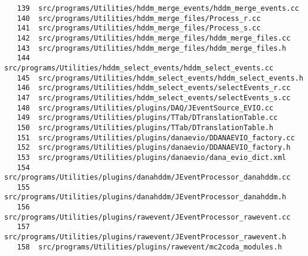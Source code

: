 \small
\begin{verbatim}
   139  src/programs/Utilities/hddm_merge_events/hddm_merge_events.cc
   140  src/programs/Utilities/hddm_merge_files/Process_r.cc
   141  src/programs/Utilities/hddm_merge_files/Process_s.cc
   142  src/programs/Utilities/hddm_merge_files/hddm_merge_files.cc
   143  src/programs/Utilities/hddm_merge_files/hddm_merge_files.h
   144  src/programs/Utilities/hddm_select_events/hddm_select_events.cc
   145  src/programs/Utilities/hddm_select_events/hddm_select_events.h
   146  src/programs/Utilities/hddm_select_events/selectEvents_r.cc
   147  src/programs/Utilities/hddm_select_events/selectEvents_s.cc
   148  src/programs/Utilities/plugins/DAQ/JEventSource_EVIO.cc
   149  src/programs/Utilities/plugins/TTab/DTranslationTable.cc
   150  src/programs/Utilities/plugins/TTab/DTranslationTable.h
   151  src/programs/Utilities/plugins/danaevio/DDANAEVIO_factory.cc
   152  src/programs/Utilities/plugins/danaevio/DDANAEVIO_factory.h
   153  src/programs/Utilities/plugins/danaevio/dana_evio_dict.xml
   154  src/programs/Utilities/plugins/danahddm/JEventProcessor_danahddm.cc
   155  src/programs/Utilities/plugins/danahddm/JEventProcessor_danahddm.h
   156  src/programs/Utilities/plugins/rawevent/JEventProcessor_rawevent.cc
   157  src/programs/Utilities/plugins/rawevent/JEventProcessor_rawevent.h
   158  src/programs/Utilities/plugins/rawevent/mc2coda_modules.h
\end{verbatim}
